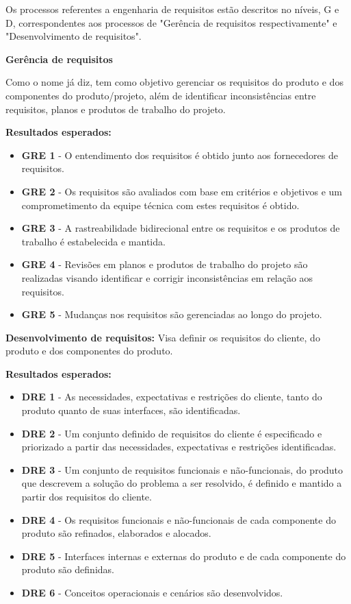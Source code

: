 Os processos referentes a engenharia de requisitos estão descritos no níveis, G e D, correspondentes aos processos de "Gerência de requisitos respectivamente" e "Desenvolvimento de requisitos".

\textbf{Gerência de requisitos}

Como o nome já diz, tem como objetivo gerenciar os requisitos do produto e dos componentes do produto/projeto, além de identificar inconsistências entre requisitos, planos e produtos de trabalho do projeto.

\textbf{Resultados esperados:}
\begin{itemize}
\item \textbf{GRE 1} - O entendimento dos requisitos é obtido junto aos fornecedores de requisitos.
\item \textbf{GRE 2} - Os requisitos são avaliados com base em critérios e objetivos e um comprometimento da equipe técnica com estes requisitos é obtido.
\item \textbf{GRE 3} - A rastreabilidade bidirecional entre os requisitos e os produtos de trabalho é estabelecida e mantida.
\item \textbf{GRE 4} - Revisões em planos e produtos de trabalho do projeto são realizadas visando identificar e corrigir inconsistências em relação aos requisitos.
\item \textbf{GRE 5} - Mudanças nos requisitos são gerenciadas ao longo do projeto.
\end{itemize}

\textbf{Desenvolvimento de requisitos:}
Visa definir os requisitos do cliente, do produto e dos componentes do produto.

\textbf{Resultados esperados:}
\begin{itemize}
\item \textbf{DRE 1} - As necessidades, expectativas e restrições do cliente, tanto do produto quanto de suas interfaces, são identificadas.
\item \textbf{DRE 2} - Um conjunto definido de requisitos do cliente é especificado e priorizado a partir das necessidades, expectativas e restrições identificadas.
\item \textbf{DRE 3} - Um conjunto de requisitos funcionais e não-funcionais, do produto que descrevem a solução do problema a ser resolvido, é definido e mantido a partir dos requisitos do cliente.
\item \textbf{DRE 4} - Os requisitos funcionais e não-funcionais de cada componente do produto são refinados, elaborados e alocados.
\item \textbf{DRE 5} - Interfaces internas e externas do produto e de cada componente do produto são definidas.
\item \textbf{DRE 6} - Conceitos operacionais e cenários são desenvolvidos.
\end{itemize}
